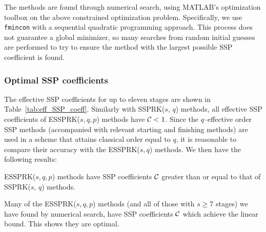 The methods are found through numerical search, using \textsc{MATLAB}'s optimization 
toolbox on the above constrained optimization problem. 
Specifically, we use \texttt{fmincon} with a sequential quadratic programming approach.
This process does not guarantee a global minimizer, so many searches from random initial 
guesses are performed to try to ensure the method with the largest possible SSP coefficient is 
found.

\subsubsection{Optimal SSP coefficients}\label{subsubsec:optimal_SSP_coeff}
The effective SSP coefficients for up to eleven stages are shown in 
Table~\ref{tab:eff_SSP_coeff}. 
Similarly with SSPRK($s$, $q$) methods, all effective SSP coefficients of ESSPRK($s,q,p$) methods 
have $\mathcal{C} < 1$. 
Since the $q$--effective order SSP methods (accompanied with relevant starting and finishing 
methods) are used in a scheme that attains classical order equal to $q$, it is reasonable to 
compare their accuracy with the ESSPRK($s,q$) methods.
We then have the following results:
\begin{result}
	ESSPRK($s,q,p$) methods have SSP coefficients $\mathcal{C}$ greater than or equal to that of 
	SSPRK($s$, $q$) methods.
\end{result}
\begin{result}
	Many of the ESSPRK($s,q,p$) methods (and all of those with $s \ge 7$ stages) we have 
	found by numerical search, have SSP coefficients $\mathcal{C}$ which achieve the linear 
	bound. 
	This shows they are optimal.  
\end{result}

